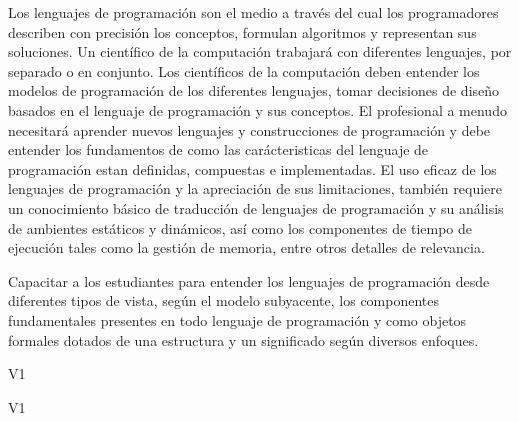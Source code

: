 \begin{syllabus}


\begin{justification}
Los lenguajes de programación son el medio a través del cual los programadores describen con precisión los conceptos, 
formulan algoritmos y representan sus soluciones. Un científico de la computación trabajará con diferentes lenguajes, 
por separado o en conjunto. Los científicos de la computación deben entender los modelos de programación de los diferentes 
lenguajes, tomar decisiones de diseño basados en el lenguaje de programación y sus conceptos. El profesional a menudo 
necesitará aprender nuevos lenguajes y construcciones de programación y debe entender los fundamentos de como las 
carácteristicas del lenguaje de programación estan definidas, compuestas e implementadas. El uso eficaz de los lenguajes 
de programación y la apreciación de sus limitaciones, también requiere un conocimiento básico de traducción de lenguajes 
de programación y su análisis de ambientes estáticos y dinámicos, así­ como los componentes de tiempo de ejecución tales 
como la gestión de memoria, entre otros detalles de relevancia.
\end{justification}

\begin{goals}
\item Capacitar a los estudiantes para entender los lenguajes de programación desde diferentes tipos de vista, según el 
modelo subyacente, los componentes fundamentales presentes en todo lenguaje de programación y como objetos formales 
dotados de una estructura y un significado según diversos enfoques.
\end{goals}

\begin{outcomes}{V1}
    \item {}
    \item {}
    \item {} 
    \item {} 		
\end{outcomes}

\begin{competences}{V1}
    \item {} 
    \item {}
    \item {}
    \item {}
    \item {}
\end{competences}


\end{syllabus}
